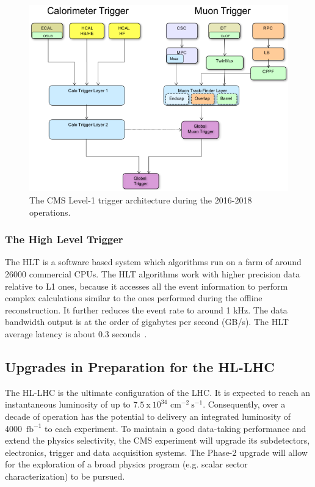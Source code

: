 \begin{figure}[ht!]
\centering
\includegraphics[width=1.0\textwidth]{Figures/Apparatus/cmsl1triggerarchp1.png}
\caption[The CMS Level-1 trigger architecture during the 2016-2018 operations]{The CMS Level-1 trigger architecture during the 2016-2018 operations.}
\label{fig:cmsl1triggerarch}
\end{figure}

\subsubsection{The High Level Trigger}
The HLT is a software based system which algorithms run on a farm of around 26000 commercial CPUs. The HLT algorithms work with higher precision data relative to L1 ones, because it accesses all the event information to perform complex calculations similar to the ones performed during the offline reconstruction. It further reduces the event rate to around 1 kHz. The data bandwidth output is at the order of gigabytes per second (GB/s). The HLT average latency is about 0.3 seconds~\cite{CMS:2008xjf,CMS:2006myw}. 

\subsection{Upgrades in Preparation for the HL-LHC}
\label{subsec:cmsupgrades}
The HL-LHC is the ultimate configuration of the LHC. It is expected to reach an instantaneous luminosity of up to $\mathrm{7.5~x~10^{34}}$ $\mathrm{cm^{-2}~s^{-1}}$. Consequently, over a decade of operation has the potential to delivery an integrated luminosity of 4000~$\mathrm{fb^{-1}}$ to each experiment. To maintain a good data-taking performance and extend the physics selectivity, the CMS experiment will upgrade its subdetectors, electronics, trigger and data acquisition systems. The Phase-2 upgrade will allow for the exploration of a
broad physics program (e.g. scalar sector characterization) to be pursued.     

